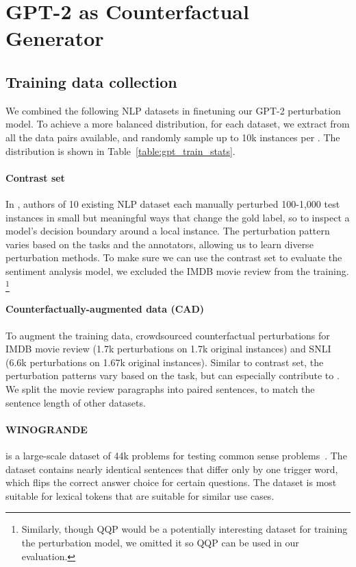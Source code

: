 \section{GPT-2 as Counterfactual Generator}
\label{appendix:train_data}

\subsection{Training data collection}


We combined the following NLP datasets in finetuning our GPT-2 perturbation model.
To achieve a more balanced distribution, for each dataset, we extract \tagstrs from all the data pairs available, and randomly sample up to 10k instances per \tagstr.
The distribution is shown in Table~\ref{table:gpt_train_stats}.

\paragraph{Contrast set}
In \cite{gardner2020contrast}, authors of 10 existing NLP dataset each manually perturbed 100-1,000 test instances in small but meaningful ways that change the gold label, so to inspect a model's decision boundary around a local instance.
The perturbation pattern varies based on the tasks and the annotators, allowing us to learn diverse perturbation methods.
To make sure we can use the contrast set to evaluate the sentiment analysis model, we excluded the IMDB movie review from the training.
\footnote{Similarly, though QQP would be a potentially interesting dataset for training the perturbation model, we omitted it so QQP can be used in our evaluation.}


\paragraph{Counterfactually-augmented data (CAD)}
To augment the training data, \citet{kaushik2019learning} crowdsourced counterfactual perturbations for IMDB movie review (1.7k perturbations on 1.7k original instances) and SNLI (6.6k perturbations on 1.67k original instances).
Similar to contrast set, the perturbation patterns vary based on the task, but can especially contribute to .
We split the movie review paragraphs into paired sentences, to match the sentence length of other datasets.


\paragraph{WINOGRANDE} is a large-scale dataset of 44k problems for testing common sense problems~\cite{sakaguchi2019winogrande}.
The dataset contains nearly identical sentences that differ only by one trigger word, which flips the correct answer choice for certain questions.
The dataset is most suitable for lexical tokens that are suitable for similar use cases.

